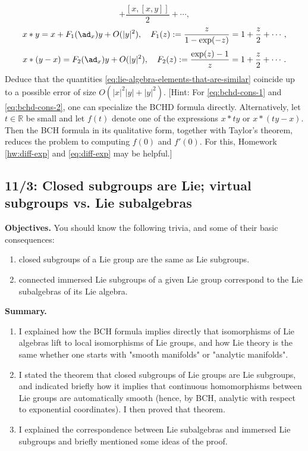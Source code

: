\documentclass[reqno]{amsart} 
\begin{document}
\begin{homework}
\begin{enumerate}
\begin{equation}
      + \frac{[x,[x,y]]}{2}
      + \dotsb,
    \end{equation}
    \begin{equation}\label{eq:bchd-cons-1}
      x \ast y
      =
      x +
      F_1(\ad_x) y + O(|y|^2),
      \quad
      F_1(z) :=
      \frac{z}{1 - \exp(-z)}
      =
      1 + \frac{z}{2} + \dotsb,
    \end{equation}
    \begin{equation}\label{eq:bchd-cons-2}
      x \ast (y-x)
      =
      F_2(\ad_x) y + O(|y|^2),
      \quad
      F_2(z) :=
      \frac{\exp(z) - 1}{z}
      =
      1 + \frac{z}{2} + \dotsb.
    \end{equation}
    Deduce that
    the quantities \eqref{eq:lie-algebra-elements-that-are-similar}
    coincide up to a possible error
    of size $O(|x|^2 |y| + |y|^2)$.
    [Hint:
    For \eqref{eq:bchd-cons-1} and \eqref{eq:bchd-cons-2},
    one can specialize the BCHD formula directly.  Alternatively,
    let $t \in \mathbb{R}$
    be small
    and
    let $f(t)$ denote one of the expressions $x \ast t y$
    or $x \ast (t y - x)$.
    Then the BCH formula in its qualitative
    form, together with Taylor's theorem,
    reduces the problem
    to computing $f(0)$ and $f'(0)$.
    For this,
    Homework \ref{hw:diff-exp} and \eqref{eq:diff-exp}
    may be helpful.]
  \end{enumerate}
\end{homework}

\subsection{11/3: Closed subgroups are Lie; virtual subgroups vs. Lie subalgebras}
\label{sec:org3214742}
\textbf{Objectives.} 
You should know the following trivia, and some of their basic consequences:
\begin{enumerate}
\item closed subgroups of a Lie group are the same as Lie subgroups.
\item connected immersed Lie subgroups of a given Lie group correspond to the Lie
subalgebras of its Lie algebra.
\end{enumerate}

\textbf{Summary.}
\begin{enumerate}
\item I explained how the BCH formula implies directly that isomorphisms
of Lie algebras lift to local isomorphisms of Lie groups, and how
Lie theory is the same whether one starts with "smooth manifolds"
or "analytic manifolds".
\item I stated the theorem that closed subgroups of Lie groups are Lie
subgroups, and indicated briefly how it implies that continuous
homomorphisms between Lie groups are automatically smooth (hence,
by BCH, analytic with respect to exponential coordinates).  I then
proved that theorem.
\item I explained the correspondence between Lie subalgebras and immersed
Lie subgroups and briefly mentioned some ideas of the proof.
\end{enumerate}
\end{document}
